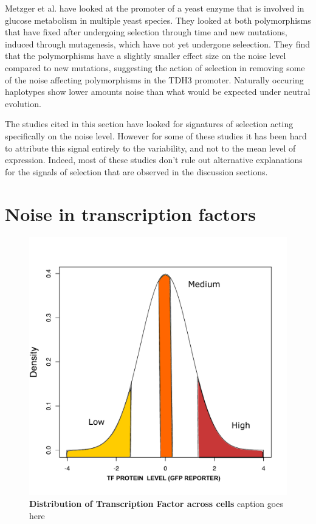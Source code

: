 Metzger et al. \cite{metzger2015n} have looked at the promoter of a yeast enzyme that is involved in glucose metabolism in multiple yeast species. They looked at both polymorphisms that have fixed after undergoing selection through time and new mutations, induced through mutagenesis, which have not yet undergone seleection. They find that the polymorphisms have a slightly smaller effect size on the noise level compared to new mutations, suggesting the action of selection in removing some of the noise affecting polymorphisms in the TDH3 promoter. Naturally occuring haplotypes show lower amounts noise than what would be expected under neutral evolution.

The studies cited in this section have looked for signatures of selection acting specifically on the noise level. However for some of these studies it has been hard to attribute this signal entirely to the variability, and not to the mean level of expression. Indeed, most of these studies don't rule out alternative explanations for the signals of selection that are observed in the discussion sections.

\section{Noise in transcription factors}

\begin{figure}[t!]  
    \centering
    \includegraphics[width=\linewidth, scale=0.25]{figures/intro/intro_gfp_density_X.pdf}
    \caption[Distribution of Transcription Factor across cells.]{%
        \textbf{Distribution of Transcription Factor across cells}
        caption goes here
    }
    \label{fig:intro2}
\end{figure}

